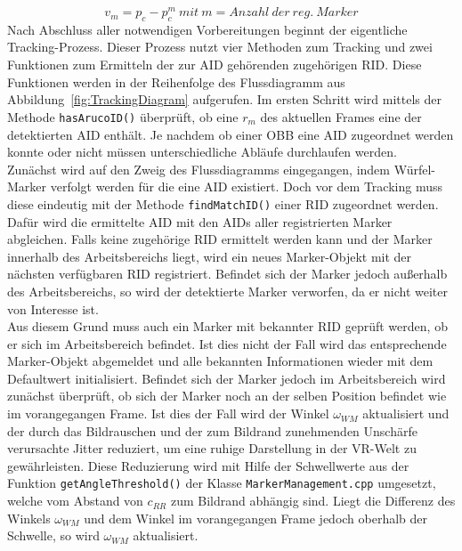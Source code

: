 \begin{equation}
\label{equ:MotionVec}
v_m = p_c - p_c^m \ mit \ m= Anzahl \ der \ reg. \ Marker
\end{equation}
Nach Abschluss aller notwendigen Vorbereitungen beginnt der eigentliche Tracking-Prozess. Dieser Prozess nutzt vier Methoden zum Tracking und zwei Funktionen zum Ermitteln der zur AID gehörenden zugehörigen RID. Diese Funktionen werden in der Reihenfolge des Flussdiagramm aus Abbildung~\ref{fig:TrackingDiagram} aufgerufen. Im ersten Schritt wird mittels der Methode \texttt{has\-Aruco\-ID()} überprüft, ob eine $r_m$ des aktuellen Frames eine der detektierten AID enthält. Je nachdem ob einer OBB eine AID zugeordnet werden konnte oder nicht müssen unterschiedliche Abläufe durchlaufen werden.\\
Zunächst wird auf den Zweig des Flussdiagramms eingegangen, indem Würfel-Marker verfolgt werden für die eine AID existiert. Doch vor dem Tracking muss diese eindeutig mit der Methode \texttt{find\-Match\-ID()} einer RID zugeordnet werden. Dafür wird die ermittelte AID mit den AIDs aller registrierten Marker abgleichen. Falls keine zugehörige RID ermittelt werden kann und der Marker innerhalb des Arbeitsbereichs liegt, wird ein neues Marker-Objekt mit der nächsten verfügbaren RID registriert. Befindet sich der Marker jedoch außerhalb des Arbeitsbereichs, so wird der detektierte Marker verworfen, da er nicht weiter von Interesse ist.\\
Aus diesem Grund muss auch ein Marker mit bekannter RID geprüft werden, ob er sich im Arbeitsbereich befindet. Ist dies nicht der Fall wird das entsprechende Marker-Objekt abgemeldet und alle bekannten Informationen wieder mit dem Defaultwert initialisiert. Befindet sich der Marker jedoch im Arbeitsbereich wird zunächst überprüft, ob sich der Marker noch an der selben Position befindet wie im vorangegangen Frame. Ist dies der Fall wird der Winkel $\omega_{WM}$ aktualisiert und der durch das Bildrauschen und der zum Bildrand zunehmenden Unschärfe verursachte Jitter reduziert, um eine ruhige Darstellung in der VR-Welt zu gewährleisten. Diese Reduzierung wird mit Hilfe der Schwellwerte aus der Funktion \texttt{get\-Angle\-Threshold()} der Klasse \texttt{Marker\-Management.cpp} umgesetzt, welche vom Abstand von $c_{RR}$ zum Bildrand abhängig sind. Liegt die Differenz des Winkels $\omega_{WM}$ und dem Winkel im vorangegangen Frame jedoch oberhalb der Schwelle, so wird $\omega_{WM}$ aktualisiert.\\
